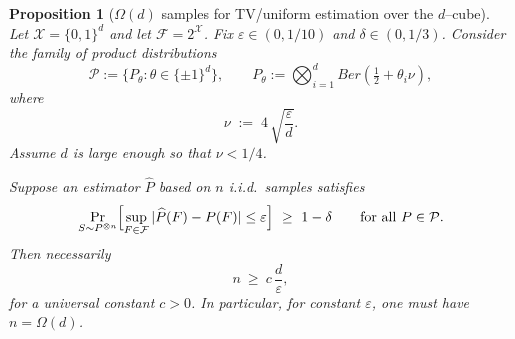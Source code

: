 \documentclass[10pt,a4paper]{amsart}
\newtheorem{proposition}{Proposition}
\newcommand{\Ber}{Ber}
\newcommand{\F}{\mathcal{F}}
\newcommand{\Pc}{\mathcal{P}}
\newcommand{\X}{\mathcal{X}}
\newcommand{\eps}{\varepsilon}
\begin{document}
\begin{proposition}[$\Omega(d)$ samples for TV/uniform estimation over the $d$--cube]
\label{prop:Omega-d-product}
Let $\X=\{0,1\}^d$ and let $\F=2^\X$.
Fix $\eps\in(0,1/10)$ and $\delta\in(0,1/3)$.
Consider the family of \emph{product} distributions
\[
\Pc := \{P_\theta : \theta\in\{\pm1\}^d\},
\qquad
P_\theta := \bigotimes_{i=1}^d \Ber\!\left(\tfrac12+\theta_i \nu\right),
\]
where
\[
\nu \;:=\; 4\,\sqrt{\frac{\eps}{d}}.
\]
Assume $d$ is large enough so that $\nu<1/4$.

Suppose an estimator $\widehat P$ based on $n$ i.i.d.\ samples satisfies
\[
\Pr_{S\sim P^{\otimes n}}
\Bigl[
\sup_{F\in\F}|\widehat P(F)-P(F)| \le \eps
\Bigr]\ \ge\ 1-\delta
\qquad\text{for all }P\in\Pc.
\]
Then necessarily
\[
n \ \ge\ c\,\frac{d}{\eps},
\]
for a universal constant $c>0$.
In particular, for constant $\eps$, one must have $n=\Omega(d)$.
\end{proposition}
\end{document}
